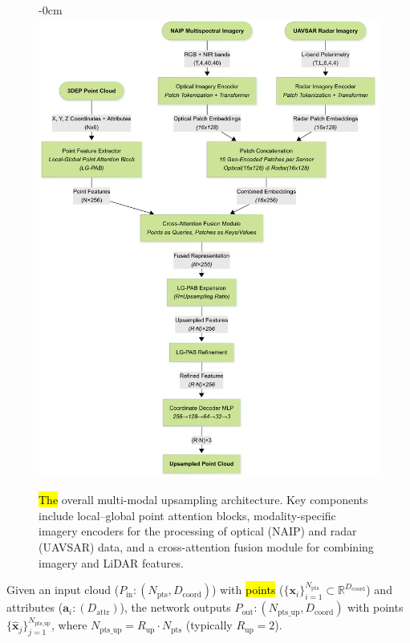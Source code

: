 \documentclass[remotesensing,article,accept,pdftex,moreauthors]{Definitions/mdpi}
\begin{document}
\begin{figure}[H]
\begin{adjustwidth}{-\extralength}{0cm}
    \centering
    \includegraphics[trim=0mm 0mm 0mm 9mm, clip, width=0.9\linewidth]{figures/Overall_Architecture.png}
    \end{adjustwidth}
    \caption{\hl{The} %
 overall multi-modal upsampling architecture. Key components include local–global point attention blocks, modality-specific imagery encoders for the processing of optical (NAIP) and radar (UAVSAR) data, and a cross-attention fusion module for combining imagery and LiDAR features.}
    \label{fig:pipeline}
\end{figure}


Given an input cloud ($P_{\text{in}}: (N_{\text{pts}}, D_{\text{coord}})$) with \hl{points} %
 ($\{\mathbf{{x}}_i\}_{i=1}^{N_{\text{pts}}}\subset\mathbb{R}^{D_{\text{coord}}}$) and attributes ($\mathbf{a}_i: (D_{\text{attr}})$), the network outputs $P_{\text{out}}: (N_{\text{pts\_up}}, D_{\text{coord}})$ with points $\{\hat{\mathbf{x}}_j\}_{j=1}^{N_{\text{pts\_up}}}$, where $N_{\text{pts\_up}} = R_{\text{up}} \cdot N_{\text{pts}}$ (typically $R_{\text{up}} = 2$).
\end{document}
